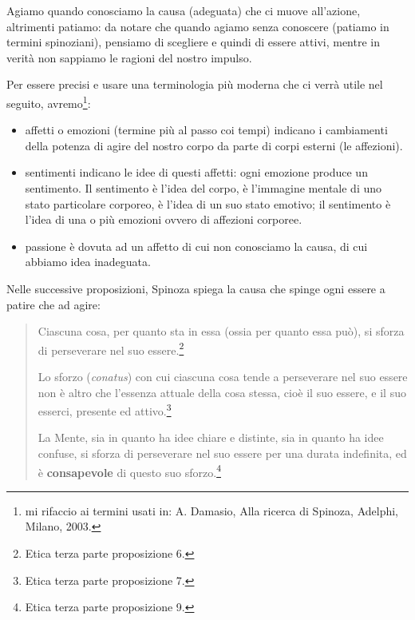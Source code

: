 Agiamo quando conosciamo la causa (adeguata) che ci muove all'azione, altrimenti patiamo: da notare che quando agiamo senza conoscere (patiamo in termini spinoziani), pensiamo di scegliere e quindi di essere attivi, mentre in verità non sappiamo le ragioni del nostro impulso.

Per essere precisi e usare una terminologia più moderna che ci verrà utile nel seguito, avremo\footnote{mi rifaccio ai termini usati in: A. Damasio, Alla ricerca di Spinoza, Adelphi, Milano, 2003.}:

\begin{itemize}
	\item affetti o emozioni (termine più al passo coi tempi) indicano i cambiamenti della potenza di agire del nostro corpo da parte di corpi esterni (le affezioni).
	\item sentimenti indicano le idee di questi affetti: ogni emozione produce un sentimento. Il sentimento è l’idea del corpo,  è l’immagine mentale di uno stato particolare corporeo, è l’idea di un suo
	stato emotivo; il sentimento è l’idea di una o più emozioni ovvero di affezioni corporee.
	\item passione è dovuta ad un affetto di cui non conosciamo la causa, di cui abbiamo idea inadeguata.
\end{itemize}

Nelle successive proposizioni, Spinoza spiega la causa che spinge ogni essere a patire che ad agire:

\begin{quotation}
	\small Ciascuna cosa, per quanto sta in essa (ossia per quanto essa può), si sforza di perseverare
	nel suo essere.\footnote{Etica terza parte proposizione 6.}
	
	Lo sforzo (\textit{conatus}) con cui ciascuna cosa tende a perseverare nel suo essere non è altro che l’essenza attuale della cosa stessa, cioè il suo essere, e il suo esserci, presente ed attivo.\footnote{Etica terza parte proposizione 7.}
	
	La Mente, sia in quanto ha idee chiare e distinte, sia in quanto ha idee confuse, si sforza
	di perseverare nel suo essere per una durata indefinita, ed è \textbf{consapevole} di questo suo sforzo.\footnote{Etica terza parte proposizione 9.}
\end{quotation}

